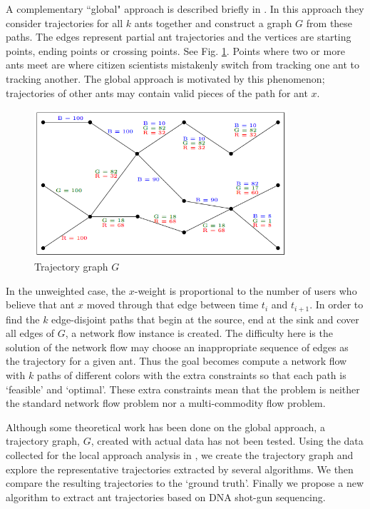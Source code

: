 \documentclass[12pt]{article}
\begin{document}
\indent A complementary ``global" approach is described briefly in \cite{Joy12}. In this approach they consider trajectories for all $k$ ants together and construct a graph $G$ from these paths. The edges represent partial ant trajectories and the vertices are starting points, ending points or crossing points. See Fig. \ref{fig:AGraph}. Points where two or more ants meet are where citizen scientists mistakenly switch from tracking one ant to tracking another. The global approach is motivated by this phenomenon; trajectories of other ants may contain valid pieces of the path for ant $x$. \\

\begin{figure}[h!]
\centering
\includegraphics[width = 3.7in]{Antgraph.png}
\caption{Trajectory graph $G$ \cite{Joy12}}
\label{fig:AGraph}
\end{figure}

\indent In the unweighted case, the $x$-weight is proportional to the number of users who believe that ant $x$ moved through that edge between time $t_i$ and $t_{i+1}$. In order to find the $k$ edge-disjoint paths that begin at the source, end at the sink and cover all edges of $G$, a network flow instance is created. The difficulty here is the solution of the network flow may choose an inappropriate sequence of edges as the trajectory for a given ant. Thus the goal becomes compute a network flow with $k$ paths of different colors with the extra constraints so that each path is `feasible' and `optimal'. These extra constraints mean that the problem is neither the standard network flow problem nor a multi-commodity flow problem.


\indent Although some theoretical work has been done on the global approach, a trajectory graph, $G$, created with actual data has not been tested. Using the data collected for the local approach analysis in \cite{Joy12}, we create the trajectory graph and explore the representative trajectories extracted by several algorithms. We then compare the resulting trajectories to the `ground truth'. Finally we propose a new algorithm to extract ant trajectories based on DNA shot-gun sequencing.
\end{document}
